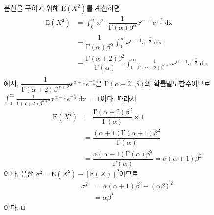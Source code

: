 분산을 구하기 위해 $\mathrm{E}\left(X^2\right)$를 계산하면
\begin{align*}
	\mathrm{E}\left(X^2\right) &= \int_0^\infty x^2 \cdot \dfrac{1}{\mathrm{\Gamma}\left(\alpha\right)\beta^\alpha}x^{\alpha-1}e^{-\frac{x}{\beta}} \mathop{dx} \\
	&= \dfrac{1}{\mathrm{\Gamma}\left(\alpha\right)\beta^\alpha} \int_0^\infty x^{\alpha + 1}e^{-\frac{x}{\beta}} \mathop{dx} \\
	&= \dfrac{\mathrm{\Gamma}\left(\alpha+2\right)\beta^2}{\mathrm{\Gamma}\left(\alpha\right)} \int_0^\infty \frac{1}{\mathrm{\Gamma}\left(\alpha+2\right)\beta^{\alpha+2}} x^{\alpha + 1}e^{-\frac{x}{\beta}} \mathop{dx} \\
\end{align*}
에서, $\dfrac{1}{\mathrm{\Gamma}\left(\alpha+2\right)\beta^{\alpha+2}} x^{\alpha + 1}e^{-\frac{x}{\beta}}$은
$\mathrm{\Gamma}\left(\alpha + 2,\,\beta\right)$의 확률밀도함수이므로 $\displaystyle \int_0^\infty \frac{1}{\mathrm{\Gamma}\left(\alpha+2\right)\beta^{\alpha+2}} x^{\alpha + 1}e^{-\frac{x}{\beta}} \mathop{dx} = 1$이다.
따라서
\begin{align*}
	\mathrm{E}\left(X^2\right) &= \dfrac{\mathrm{\Gamma}\left(\alpha+2\right)\beta^2}{\mathrm{\Gamma}\left(\alpha\right)} \times 1 \\
	&= \dfrac{\left(\alpha+1\right)\mathrm{\Gamma}\left(\alpha+1\right)\beta^2}{\mathrm{\Gamma}\left(\alpha\right)} \\
	&= \dfrac{\alpha\left(\alpha+1\right)\mathrm{\Gamma}\left(\alpha\right)\beta^2}{\mathrm{\Gamma}\left(\alpha\right)} = \alpha\left(\alpha+1\right)\beta^2
\end{align*}
이다. 분산 $\sigma^2 = \mathrm{E}\left(X^2\right) - \left[\mathrm{E}\left(X\right)\right]^2$이므로
\begin{align*}
	\sigma^2 &= \alpha\left(\alpha+1\right)\beta^2 - \left(\alpha\beta\right)^2 \\
	&= \alpha\beta^2
\end{align*}
이다. $\qed$